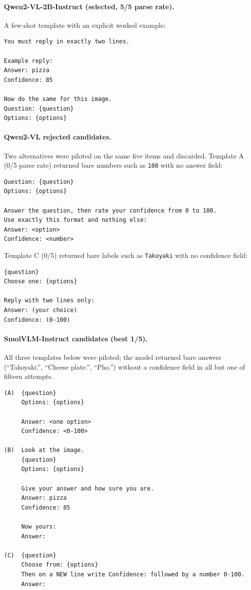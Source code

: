 \documentclass[11pt]{article}
\begin{document}
\paragraph{Qwen2-VL-2B-Instruct (selected, 5/5 parse rate).}
A few-shot template with an explicit worked example:

\begin{verbatim}
You must reply in exactly two lines.

Example reply:
Answer: pizza
Confidence: 85

Now do the same for this image.
Question: {question}
Options: {options}
\end{verbatim}

\paragraph{Qwen2-VL rejected candidates.} Two alternatives were piloted on the
same five items and discarded. Template A (0/5 parse rate) returned bare
numbers such as \texttt{100} with no answer field:

\begin{verbatim}
Question: {question}
Options: {options}

Answer the question, then rate your confidence from 0 to 100.
Use exactly this format and nothing else:
Answer: <option>
Confidence: <number>
\end{verbatim}

Template C (0/5) returned bare labels such as \texttt{Takoyaki} with no
confidence field:

\begin{verbatim}
{question}
Choose one: {options}

Reply with two lines only:
Answer: (your choice)
Confidence: (0-100)
\end{verbatim}

\paragraph{SmolVLM-Instruct candidates (best 1/5).} All three templates below
were piloted; the model returned bare answers (``Takoyaki.'', ``Cheese
plate.'', ``Pho.'') without a confidence field in all but one of fifteen
attempts.

\begin{verbatim}
(A)  {question}
     Options: {options}

     Answer: <one option>
     Confidence: <0-100>

(B)  Look at the image.
     {question}
     Options: {options}

     Give your answer and how sure you are.
     Answer: pizza
     Confidence: 85

     Now yours:
     Answer:

(C)  {question}
     Choose from: {options}
     Then on a NEW line write Confidence: followed by a number 0-100.
     Answer:
\end{verbatim}
\end{document}
